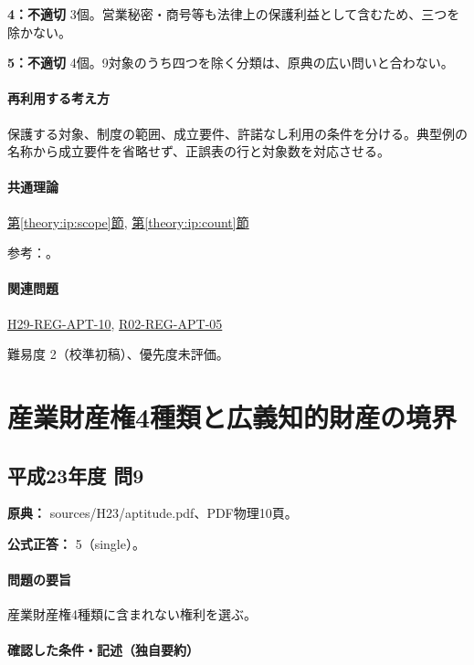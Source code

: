 \noindent\textbf{4：不適切} 3個。営業秘密・商号等も法律上の保護利益として含むため、三つを除かない。\par

\noindent\textbf{5：不適切} 4個。9対象のうち四つを除く分類は、原典の広い問いと合わない。\par

\paragraph{再利用する考え方} 保護する対象、制度の範囲、成立要件、許諾なし利用の条件を分ける。典型例の名称から成立要件を省略せず、正誤表の行と対象数を対応させる。

\paragraph{共通理論} \hyperref[theory:ip:scope]{第\ref*{theory:ip:scope}節}, \hyperref[theory:ip:count]{第\ref*{theory:ip:count}節}

\par 参考：\cite{ip_basic_act,ip_broad_scope}。

\paragraph{関連問題} \hyperref[q:h29-reg-apt-10]{H29-REG-APT-10}, \hyperref[q:r02-reg-apt-05]{R02-REG-APT-05}

\par 難易度 2（校準初稿）、優先度未評価。

\section{産業財産権4種類と広義知的財産の境界}

\subsection{平成23年度 問9}
\label{q:h23-reg-apt-09}

\noindent\textbf{原典：} sources/H23/aptitude.pdf、PDF物理10頁。

\textbf{公式正答：} 5（single）。

\paragraph{問題の要旨} 産業財産権4種類に含まれない権利を選ぶ。

\paragraph{確認した条件・記述（独自要約）}\mbox{}\par

